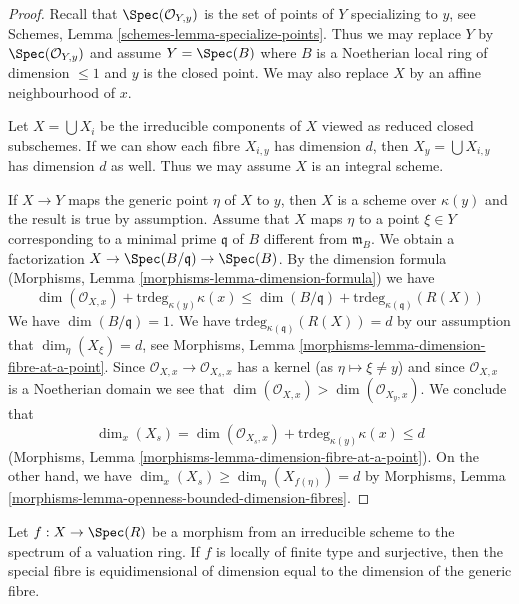 \begin{proof}
Recall that $\Spec(\mathcal{O}_{Y, y})$
is the set of points of $Y$ specializing to $y$, see
Schemes, Lemma \ref{schemes-lemma-specialize-points}.
Thus we may replace $Y$ by $\Spec(\mathcal{O}_{Y, y})$
and assume $Y = \Spec(B)$ where $B$ is a Noetherian
local ring of dimension $\leq 1$ and $y$ is the closed point.
We may also replace $X$ by an affine neighbourhood of $x$.

\medskip\noindent
Let $X = \bigcup X_i$ be the irreducible components of $X$ viewed
as reduced closed subschemes. If we can show each fibre $X_{i, y}$
has dimension $d$, then $X_y = \bigcup X_{i, y}$ has dimension $d$ as
well. Thus we may assume $X$ is an integral scheme.

\medskip\noindent
If $X \to Y$ maps the generic point $\eta$ of $X$ to $y$, then $X$
is a scheme over $\kappa(y)$ and the result is true by assumption.
Assume that $X$ maps $\eta$ to a point $\xi \in Y$ corresponding
to a minimal prime $\mathfrak q$ of $B$ different from $\mathfrak m_B$.
We obtain a factorization $X \to \Spec(B/\mathfrak q) \to \Spec(B)$.
By the dimension formula
(Morphisms, Lemma \ref{morphisms-lemma-dimension-formula})
we have
$$
\dim(\mathcal{O}_{X, x}) + \text{trdeg}_{\kappa(y)} \kappa(x) \leq
\dim(B/\mathfrak q) + \text{trdeg}_{\kappa(\mathfrak q)}(R(X))
$$
We have $\dim(B/\mathfrak q) = 1$. We have
$\text{trdeg}_{\kappa(\mathfrak q)}(R(X)) = d$ by
our assumption that $\dim_\eta(X_\xi) = d$, see
Morphisms, Lemma \ref{morphisms-lemma-dimension-fibre-at-a-point}.
Since $\mathcal{O}_{X, x} \to \mathcal{O}_{X_s, x}$ has a kernel
(as $\eta \mapsto \xi \not = y$) and since $\mathcal{O}_{X, x}$
is a Noetherian domain we see that
$\dim(\mathcal{O}_{X, x}) > \dim(\mathcal{O}_{X_y, x})$.
We conclude that
$$
\dim_x(X_s) =
\dim(\mathcal{O}_{X_s, x}) + \text{trdeg}_{\kappa(y)} \kappa(x) \leq d
$$
(Morphisms, Lemma \ref{morphisms-lemma-dimension-fibre-at-a-point}).
On the other hand, we have
$\dim_x(X_s) \geq \dim_\eta(X_{f(\eta)}) = d$ by
Morphisms, Lemma \ref{morphisms-lemma-openness-bounded-dimension-fibres}.
\end{proof}

\begin{lemma}
\label{lemma-dominate-valuation-ring-dimension-fibres}
Let $f : X \to \Spec(R)$ be a morphism from an irreducible
scheme to the spectrum of a valuation ring. If $f$ is locally
of finite type and surjective, then the special fibre is
equidimensional of dimension equal to the dimension of the generic fibre.
\end{lemma}

